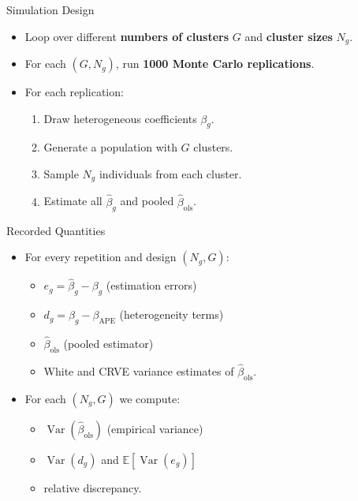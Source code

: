 \documentclass[
  ignorenonframetext,
]{beamer}
\providecommand{\tightlist}{%
  \setlength{\itemsep}{0pt}\setlength{\parskip}{0pt}}
\begin{document}
\begin{frame}{Simulation Design}
\label{simulation-design}
\begin{itemize}
\tightlist
\item
  Loop over different \textbf{numbers of clusters} \(G\) and
  \textbf{cluster sizes} \(N_g\).
\item
  For each \((G, N_g)\), run \textbf{1000 Monte Carlo replications}.
\item
  For each replication:

  \begin{enumerate}
  \tightlist
  \item
    Draw heterogeneous coefficients \(\beta_g\).
  \item
    Generate a population with \(G\) clusters.
  \item
    Sample \(N_g\) individuals from each cluster.
  \item
    Estimate all \(\hat{\beta}_g\) and pooled
    \(\hat{\beta}_{\text{ols}}\).
  \end{enumerate}
\end{itemize}
\end{frame}

\begin{frame}{Recorded Quantities}
\label{recorded-quantities}
\begin{itemize}
\tightlist
\item
  For every repetition and design \((N_g,G)\):

  \begin{itemize}
  \tightlist
  \item
    \(e_g = \hat{\beta}_g - \beta_g\) (estimation errors)
  \item
    \(d_g = \beta_g - \beta_{\text{APE}}\) (heterogeneity terms)
  \item
    \(\hat{\beta}_{\text{ols}}\) (pooled estimator)
  \item
    White and CRVE variance estimates of \(\hat{\beta}_{\text{ols}}\).
  \end{itemize}
\item
  For each \((N_g,G)\) we compute:

  \begin{itemize}
  \tightlist
  \item
    \(\operatorname{Var}(\hat{\beta}_{\text{ols}})\) (empirical
    variance)
  \item
    \(\operatorname{Var}(d_g)\) and
    \(\mathbb{E}[\operatorname{Var}(e_g)]\)
  \item
    relative discrepancy.
  \end{itemize}
\end{itemize}
\end{frame}
\end{document}
